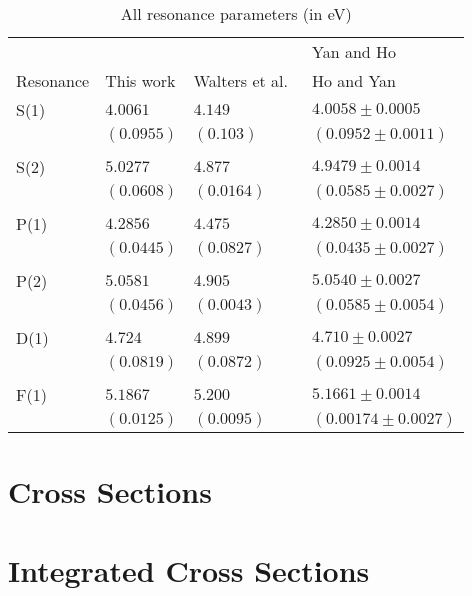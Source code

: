 \documentclass[Dissertation.tex]{subfiles}
\begin{document}
\setlength{\abovecaptionskip}{6pt}   %
\setlength{\belowcaptionskip}{6pt}   %
\begin{table}[H]
\centering
\begin{tabular}{l l l l}
\toprule
 & & & Yan and Ho \cite{Yan1999, Yan1998a} \\
Resonance & This work & Walters et al.\ \cite{Walters2004} & Ho and Yan \cite{Ho1998, Ho2000} \\
\midrule
S(1) & $4.0061$ & $4.149$ & $4.0058 \pm 0.0005$ \\
     & $(0.0955)$ & $(0.103)$ & $(0.0952 \pm 0.0011)$ \\
\\
S(2) & $5.0277$ & $4.877$ & $4.9479 \pm 0.0014$ \\
     & $(0.0608)$ & $(0.0164)$ & $(0.0585 \pm 0.0027)$ \\
\\
P(1) & $4.2856$ & $4.475$ & $4.2850 \pm 0.0014$ \\
     & $(0.0445)$ & $(0.0827)$ & $(0.0435 \pm 0.0027)$ \\
\\
P(2) & $5.0581$ & $4.905$ & $5.0540 \pm 0.0027$ \\
     & $(0.0456)$ & $(0.0043)$ & $(0.0585 \pm 0.0054)$ \\
\\
D(1) & $4.724$ & $4.899$ & $4.710 \pm 0.0027$ \\
     & $(0.0819)$ & $(0.0872)$ & $(0.0925 \pm 0.0054)$ \\
\\
F(1) & $5.1867$ & $5.200$ & $5.1661 \pm 0.0014$ \\
     & $(0.0125)$ & $(0.0095)$ & $(0.00174 \pm 0.0027)$ \\
\bottomrule
\end{tabular}
\caption{All resonance parameters (in eV)}
\label{tab:AllResonanceComparisons}
\end{table}


\section{Cross Sections}
\label{sec:cross}

\section{Integrated Cross Sections}
\label{sec:totalcross}
\end{document}
